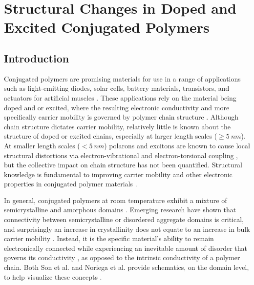 %
\chapter{Structural Changes in Doped and Excited Conjugated Polymers}

\section{Introduction}

Conjugated polymers are promising materials for use in a range of applications such as light-emitting diodes, solar cells, battery materials, transistors, and actuators for artificial muscles \cite{Swager2017}. These applications rely on the material being doped and or excited, where the resulting electronic conductivity and more specifically carrier mobility is governed by polymer chain structure \cite{Noriega2013a, Noriega2013}. Although chain structure dictates carrier mobility, relatively little is known about the structure of doped or excited chains, especially at larger length scales ($\geq 5 \ nm$). At smaller length scales ($< 5 \ nm$) polarons and excitons are known to cause local structural distortions via electron-vibrational and electron-torsional coupling \cite{Tapping2014, Zhou2015, Yu2012, Busby2011}, but the collective impact on chain structure has not been quantified. Structural knowledge is fundamental to improving carrier mobility and other electronic properties in conjugated polymer materials \cite{Beaujuge2011, Kuei2017}.

In general, conjugated polymers at room temperature exhibit a mixture of semicrystalline and amorphous domains \cite{Shen2016}. Emerging research have shown that connectivity between semicrystalline or disordered aggregate domains is critical, and surprisingly an increase in crystallinity does not equate to an increase in bulk carrier mobility \cite{Son2016, Noriega2013}. Instead, it is the specific material's ability to remain electronically connected while experiencing an inevitable amount of disorder that governs its conductivity \cite{Noriega2013}, as opposed to the intrinsic conductivity of a polymer chain. Both Son et al. and Noriega et al. provide schematics, on the domain level, to help visualize these concepts \cite{Son2016, Noriega2013}.

